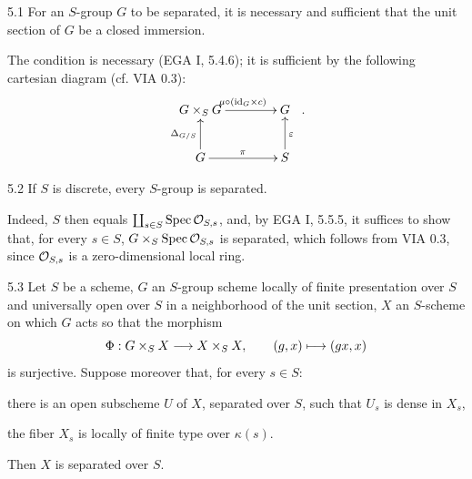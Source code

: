 \begin{proposition}{5.1}\label{VIB.5.1}
For an $S$-group $G$ to be separated, it is necessary and sufficient that the unit section of $G$ be a closed immersion.
\end{proposition}
The condition is necessary (EGA I, 5.4.6); it is sufficient by the following cartesian diagram (cf. VIA 0.3):
\[
\xymatrix@C=4em{G\times_SG\ar[r]^{\mu\circ(\mathrm{id}_G\times c)}&G\\G\ar[u]^{\Delta_{G/S}}\ar[r]^\pi&S\ar[u]_\varepsilon}\ .
\]
\begin{proposition}{5.2}\label{VIB.5.2}
If $S$ is discrete, every $S$-group is separated.
\end{proposition}
Indeed, $S$ then equals $\coprod_{s\in S}\operatorname{Spec}\mathcal{O}_{S,s}$, and, by EGA I, 5.5.5, it suffices to show that, for every $s\in S$, $G\times_S\operatorname{Spec}\mathcal{O}_{S,s}$ is separated, which follows from VIA 0.3, since $\mathcal{O}_{S,s}$ is a zero-dimensional local ring.
\begin{theorem}{5.3}\label{VIB.5.3}
Let $S$ be a scheme, $G$ an $S$-group scheme locally of finite presentation over $S$ and universally open over $S$ in a neighborhood of the unit section, $X$ an $S$-scheme on which $G$ acts so that the morphism
\[
\Phi:G\times_SX\longrightarrow X\times_SX,\qquad(g,x)\longmapsto(gx,x)
\]
is surjective. Suppose moreover that, for every $s\in S$:
\begin{enumeratei}
\item there is an open subscheme $U$ of $X$, separated over $S$, such that $U_s$ is dense in $X_s$,
\item the fiber $X_s$ is locally of finite type over $\kappa(s)$.
\end{enumeratei}
Then $X$ is separated over $S$.
\end{theorem}
